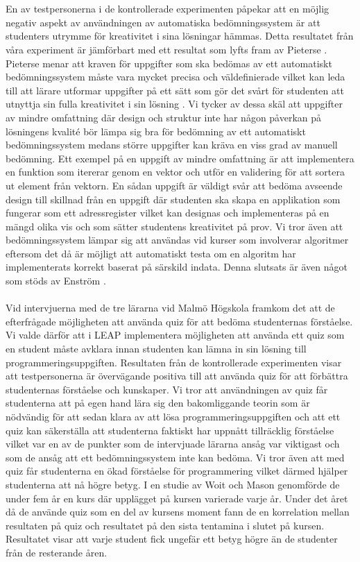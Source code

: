 \documentclass[a4paper,11pt]{article}
\begin{document}
{\\
\\
En av testpersonerna i de kontrollerade experimenten påpekar att en möjlig negativ aspekt av användningen av automatiska bedömningssystem är att studenters utrymme för kreativitet i sina lösningar hämmas. Detta resultatet från våra experiment är jämförbart med ett resultat som lyfts fram av Pieterse \cite{pieterse}. Pieterse menar att kraven för uppgifter som ska bedömas av ett automatiskt bedömningssystem måste vara mycket precisa och väldefinierade vilket kan leda till att lärare utformar uppgifter på ett sätt som gör det svårt för studenten att utnyttja sin fulla kreativitet i sin lösning \cite{pieterse}. Vi tycker av dessa skäl att uppgifter av mindre omfattning där design och struktur inte har någon påverkan på lösningens kvalité bör lämpa sig bra för bedömning av ett automatiskt bedömningssystem medans större uppgifter kan kräva en viss grad av manuell bedömning. Ett exempel på en uppgift av mindre omfattning är att implementera en funktion som itererar genom en vektor och utför en validering för att sortera ut element från vektorn. En sådan uppgift är väldigt svår att bedöma avseende design till skillnad från en uppgift där studenten ska skapa en applikation som fungerar som ett adressregister vilket kan designas och implementeras på en mängd olika vis och som sätter studentens kreativitet på prov. Vi tror även att bedömningssystem lämpar sig att användas vid kurser som involverar algoritmer eftersom det då är möjligt att automatiskt testa om en algoritm har implementerats korrekt baserat på särskild indata. Denna slutsats är även något som stöds av Enström \cite{enstrom}.
\\
\\
Vid intervjuerna med de tre lärarna vid Malmö Högskola framkom det att de efterfrågade möjligheten att använda quiz för att bedöma studenternas förståelse. Vi valde därför att i LEAP implementera möjligheten att använda ett quiz som en student måste avklara innan studenten kan lämna in sin lösning till programmeringsuppgiften. Resultaten från de kontrollerade experimenten visar att testpersonerna är övervägande positiva till att använda quiz för att förbättra studenternas förståelse och kunskaper. Vi tror att användningen av quiz får studenterna att på egen hand lära sig den bakomliggande teorin som är nödvändig för att sedan klara av att lösa programmeringsuppgiften och att ett quiz kan säkerställa att studenterna faktiskt har uppnått tillräcklig förståelse vilket var en av de punkter som de intervjuade lärarna ansåg var viktigast och som de ansåg att ett bedömningssystem inte kan bedöma. Vi tror även att med quiz får studenterna en ökad förståelse för programmering vilket därmed hjälper studenterna att nå högre betyg. I en studie av Woit och Mason \cite{woit_2003} genomförde de under fem år en kurs där upplägget på kursen varierade varje år. Under det året då de använde quiz som en del av kursens moment fann de en korrelation mellan resultaten på quiz och resultatet på den sista tentamina i slutet på kursen. Resultatet visar att varje student fick ungefär ett betyg högre än de studenter från de resterande åren.

}
\end{document}
